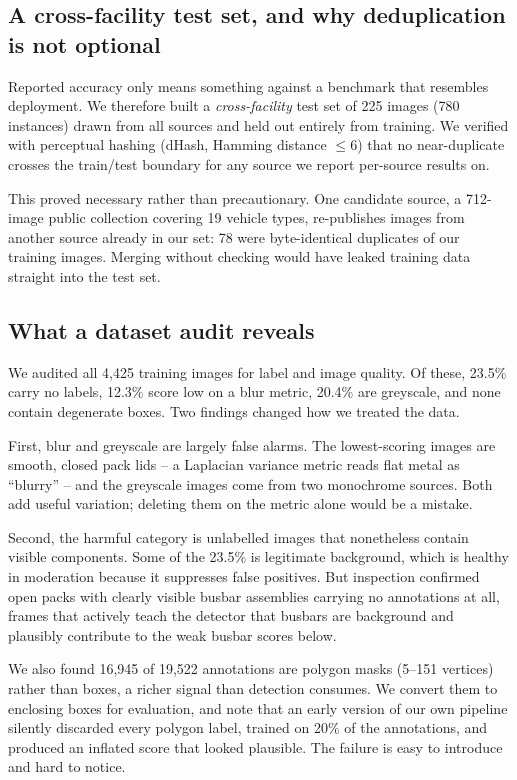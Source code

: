 \documentclass[conference]{IEEEtran}
\begin{document}
\subsection{A cross-facility test set, and why deduplication is not optional}
Reported accuracy only means something against a benchmark that resembles deployment.
We therefore built a \emph{cross-facility} test set of 225 images (780 instances)
drawn from all sources and held out entirely from training. We verified with
perceptual hashing (dHash, Hamming distance $\leq 6$) that no near-duplicate crosses
the train/test boundary for any source we report per-source results on.

This proved necessary rather than precautionary. One candidate source, a 712-image
public collection covering 19 vehicle types, re-publishes images from another source
already in our set: 78 were byte-identical duplicates of our training images. Merging
without checking would have leaked training data straight into the test set.

\subsection{What a dataset audit reveals}
\label{sec:data-analysis}
We audited all 4,425 training images for label and image quality. Of these, 23.5\%
carry no labels, 12.3\% score low on a blur metric, 20.4\% are greyscale, and none
contain degenerate boxes. Two findings changed how we treated the data.

First, blur and greyscale are largely false alarms. The lowest-scoring images are
smooth, closed pack lids -- a Laplacian variance metric reads flat metal as
``blurry'' -- and the greyscale images come from two monochrome sources. Both add
useful variation; deleting them on the metric alone would be a mistake.

Second, the harmful category is unlabelled images that nonetheless contain visible
components. Some of the 23.5\% is legitimate background, which is healthy in moderation
because it suppresses false positives. But inspection confirmed open packs with clearly
visible busbar assemblies carrying no annotations at all, frames that actively teach
the detector that busbars are background and plausibly contribute to the weak busbar
scores below.

We also found 16,945 of 19,522 annotations are polygon masks (5--151 vertices) rather
than boxes, a richer signal than detection consumes. We convert them to enclosing
boxes for evaluation, and note that an early version of our own pipeline silently
discarded every polygon label, trained on 20\% of the annotations, and produced an
inflated score that looked plausible. The failure is easy to introduce and hard to
notice.
\end{document}
